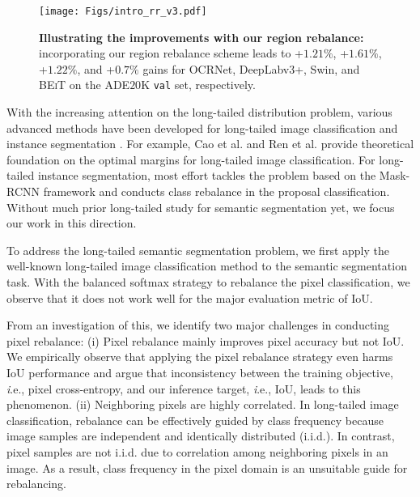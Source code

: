 \documentclass[final]{cvpr}
\begin{document}
\begin{figure}[t]
\begin{center}
\hspace{-7mm}
\texttt{[image: Figs/intro\_rr\_v3.pdf]}
\caption{\textbf{Illustrating the improvements with our region rebalance:}
incorporating our region rebalance scheme leads to +$1.21\%$, +$1.61\%$, +$1.22\%$, and +$0.7\%$ gains for OCRNet, DeepLabv$3$+, Swin, and \textsc{BEiT} on the ADE$20$K \texttt{val} set, respectively.}
\label{fig:comparison_ade20k}
\end{center}
\vspace{-0.3in}
\end{figure}


With the increasing attention on the long-tailed distribution problem, various advanced methods have been developed for long-tailed image classification \cite{buda2018systematic,huang2016learning,DBLP:conf/cvpr/CuiJLSB19, he2009learning,chawla2002smote,DBLP:conf/nips/RenYSMZYL20,DBLP:conf/iclr/KangXRYGFK20, DBLP:journals/corr/abs-2010-01809, DBLP:journals/corr/abs-2101-10633, DBLP:conf/nips/TangHZ20, Zhong_2021_CVPR,cui2021parametric} and instance segmentation \cite{tan2020eql, li2020overcoming, wang2021seesaw}.
For example, Cao et al. \cite{ldam} and Ren et al. \cite{DBLP:conf/nips/RenYSMZYL20} provide theoretical foundation on the optimal margins for long-tailed image classification. For long-tailed instance segmentation, most effort tackles the problem based on the Mask-RCNN framework \cite{he2017mask} and conducts class rebalance in the proposal classification.
Without much prior long-tailed study for semantic segmentation yet, we focus our work in this direction.

To address the long-tailed semantic segmentation problem, we first apply the well-known long-tailed image classification method to the semantic segmentation task. With the balanced softmax strategy \cite{DBLP:conf/nips/RenYSMZYL20} to rebalance the pixel
classification, we observe that it does not work well for the major evaluation metric of $\mathrm{IoU}$.

From an investigation of this, we identify two major challenges in conducting pixel rebalance:
(i) Pixel rebalance mainly improves pixel accuracy but not $\mathrm{IoU}$.
We empirically observe that applying the pixel rebalance strategy even harms $\mathrm{IoU}$ performance and argue that inconsistency between the training objective, {\textit i.e.}, pixel cross-entropy, and our inference target, {\textit i.e.}, $\mathrm{IoU}$, leads to this phenomenon.
(ii) Neighboring pixels are highly correlated. In long-tailed image classification, rebalance can be effectively guided by class frequency because image samples are independent and identically distributed (i.i.d.). In contrast, pixel samples are not i.i.d. due to correlation among neighboring pixels in an image. As a result, class frequency in the pixel domain is an unsuitable guide for rebalancing.
\end{document}
